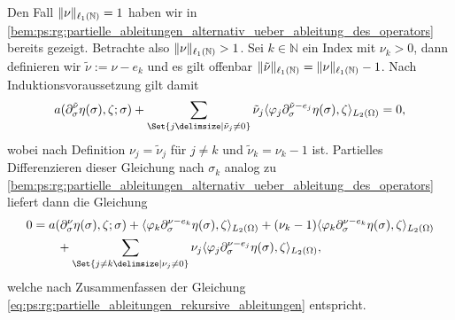 \begin{Satz}
\begin{Beweis}
        Den Fall $\lVert\nu\rVert_{\ell_{1}(\mathbb{N})} = 1$ haben wir in \cref{bem:ps:rg:partielle_ableitungen_alternativ_ueber_ableitung_des_operators} bereits gezeigt.
        Betrachte also $\lVert\nu\rVert_{\ell_{1}(\mathbb{N})} > 1$.
        Sei $k \in \mathbb{N}$ ein Index mit $\nu_{k} > 0$, dann definieren wir $\tilde{\nu} := \nu - e_{k}$ und es gilt offenbar $\lVert\tilde\nu\rVert_{\ell_{1}(\mathbb{N})} = \lVert\nu\rVert_{\ell_{1}(\mathbb{N})} - 1$.
        Nach Induktionsvoraussetzung gilt damit
        \begin{equation}
            a(\partial^{\tilde{\nu}}_{\sigma} \eta(\sigma), \zeta; \sigma) + \sum_{\Set{j \given \tilde{\nu}_{j} \neq 0}} \tilde{\nu}_{j} \skp{\varphi_{j} \partial^{\tilde{\nu} - e_{j}}_{\sigma} \eta(\sigma)}{\zeta}{L_{2}(\Omega)} = 0,
        \end{equation}
        wobei nach Definition $\nu_{j} = \tilde{\nu}_{j}$ für $j \neq k$ und $\tilde{\nu}_{k} = \nu_{k} - 1$ ist.
        Partielles Differenzieren dieser Gleichung nach $\sigma_{k}$ analog zu \cref{bem:ps:rg:partielle_ableitungen_alternativ_ueber_ableitung_des_operators} liefert dann die Gleichung
        \begin{align}
            0 &=
                a(\partial^{\nu}_{\sigma} \eta(\sigma), \zeta; \sigma)
                + \skp{\varphi_{k} \partial^{\nu - e_{k}}_{\sigma} \eta(\sigma)}{\zeta}{L_{2}(\Omega)}
                + (\nu_{k} - 1) \skp{\varphi_{k} \partial^{\nu - e_{k}}_{\sigma} \eta(\sigma) }{\zeta}{L_{2}(\Omega)}
           \\&\qquad     + \sum_{\Set{j \neq k \given \nu_{j} \neq 0}} \nu_{j} \skp{\varphi_{j} \partial^{\nu - e_{j}}_{\sigma} \eta(\sigma)}{\zeta}{L_{2}(\Omega)},
        \end{align}
        welche nach Zusammenfassen der Gleichung \cref{eq:ps:rg:partielle_ableitungen_rekursive_ableitungen} entspricht.


\end{Beweis}
\end{Satz}
